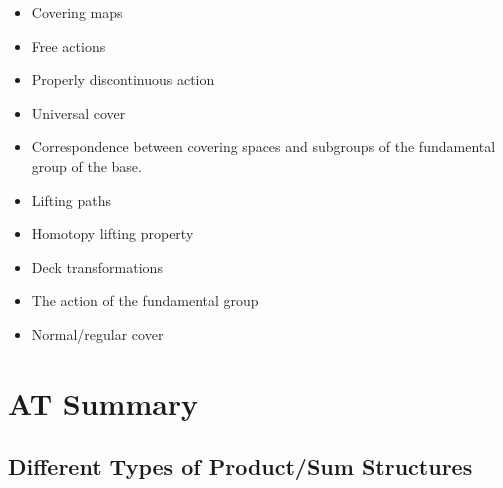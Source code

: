 \begin{itemize}
  \begin{itemize}
  \tightlist
  \item
    Covering maps
  \item
    Free actions
  \item
    Properly discontinuous action
  \item
    Universal cover
  \item
    Correspondence between covering spaces and subgroups of the
    fundamental group of the base.
  \item
    Lifting paths
  \item
    Homotopy lifting property
  \item
    Deck transformations
  \item
    The action of the fundamental group
  \item
    Normal/regular cover
  \end{itemize}
\end{itemize}

\hypertarget{at-summary}{%
\section{AT Summary}\label{at-summary}}

\hypertarget{different-types-of-productsum-structures}{%
\subsection{Different Types of Product/Sum
Structures}\label{different-types-of-productsum-structures}}

